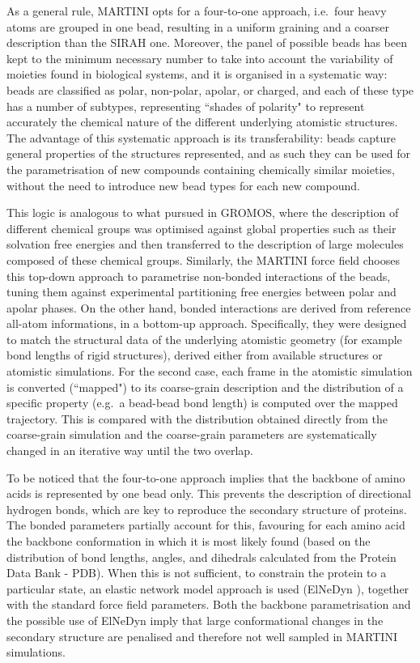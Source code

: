 As a general rule, MARTINI opts for a four-to-one approach, i.e.\ four heavy atoms are grouped in one bead, resulting in a uniform graining and a coarser description than the SIRAH one. Moreover, the panel of possible beads has been kept to the minimum necessary number to take into account the variability of moieties found in biological systems, and it is organised in a systematic way: beads are classified as polar, non-polar, apolar, or charged, and each of these type has a number of subtypes, representing ``shades of polarity" to represent accurately the chemical nature of the different underlying atomistic structures.
%
The advantage of this systematic approach is its transferability: beads capture general properties of the structures represented, and as such they can be used for the parametrisation of new compounds containing chemically similar moieties, without the need to introduce new bead types for each new compound.

This logic is analogous to what pursued in GROMOS, where the description of different chemical groups was optimised against global properties such as their solvation free energies and then transferred to the description of large molecules composed of these chemical groups.
%
Similarly, the MARTINI force field chooses this top-down approach to parametrise non-bonded interactions of the beads, tuning them against experimental partitioning free energies between polar and apolar phases. On the other hand, bonded interactions are derived from reference all-atom informations, in a bottom-up approach.
%
Specifically, they were designed to match the structural data of the underlying atomistic geometry (for example bond lengths of rigid structures), derived either from available structures or atomistic simulations. For the second case, each frame in the atomistic simulation is converted (``mapped") to its coarse-grain description and the distribution of a specific property (e.g.\ a bead-bead bond length) is computed over the mapped trajectory. This is compared with the distribution obtained directly from the coarse-grain simulation and the coarse-grain parameters are systematically changed in an iterative way until the two overlap.

To be noticed that the four-to-one approach implies that the backbone of amino acids is represented by one bead only. This prevents the description of directional hydrogen bonds, which are key to reproduce the secondary structure of proteins. The bonded parameters partially account for this, favouring for each amino acid the backbone conformation in which it is most likely found (based on the distribution of bond lengths, angles, and dihedrals calculated from the Protein Data Bank - PDB). When this is not sufficient, to constrain the protein to a particular state, an elastic network model approach is used (ElNeDyn \cite{Periole2009}), together with the standard force field parameters. Both the backbone parametrisation and the possible use of ElNeDyn imply that large conformational changes in the secondary structure are penalised and therefore not well sampled in MARTINI simulations.

